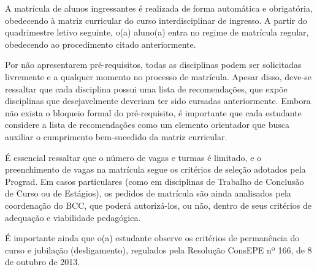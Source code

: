A matrícula de alunos ingressantes é realizada de forma automática e
obrigatória, obedecendo à matriz curricular do curso interdisciplinar de
ingresso.
A partir do quadrimestre letivo seguinte, o(a) aluno(a) entra no regime de
matrícula regular, obedecendo ao procedimento citado anteriormente.

Por não apresentarem pré-requisitos, todas as disciplinas podem ser solicitadas
livremente e a qualquer momento no processo de matrícula.
Apesar disso, deve-se ressaltar que cada disciplina possui uma lista de
recomendações, que expõe disciplinas que desejavelmente deveriam ter sido
cursadas anteriormente.
Embora não exista o bloqueio formal do pré-requisito, é importante que cada
estudante considere a lista de recomendações como um elemento orientador que
busca auxiliar o cumprimento bem-sucedido da matriz curricular.

É essencial ressaltar que o número de vagas e turmas é limitado, e o
preenchimento de vagas na matrícula segue os critérios de seleção adotados pela
Prograd.
Em casos particulares (como em disciplinas de Trabalho de Conclusão de Curso ou
de Estágios), os pedidos de matrícula são ainda analisados pela coordenação do
BCC, que poderá autorizá-los, ou não, dentro de seus critérios de adequação e
viabilidade pedagógica.

É importante ainda que o(a) estudante observe os critérios de permanência do
curso e jubilação (desligamento), regulados pela Resolução ConsEPE nº 166, de
8 de outubro de 2013.
